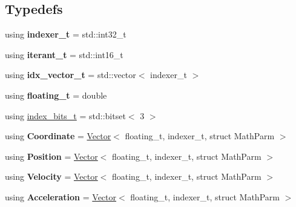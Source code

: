 \subsection*{Typedefs}
\begin{DoxyCompactItemize}
\item 
\mbox{\label{namespacemgs_a373b455db997509a22f67a5df3a194c4}} 
using {\bfseries indexer\+\_\+t} = std\+::int32\+\_\+t
\item 
\mbox{\label{namespacemgs_a0810746635a2da1b13b45c8528762689}} 
using {\bfseries iterant\+\_\+t} = std\+::int16\+\_\+t
\item 
\mbox{\label{namespacemgs_a4db3f28b798eb720761deca45dc72b4c}} 
using {\bfseries idx\+\_\+vector\+\_\+t} = std\+::vector$<$ indexer\+\_\+t $>$
\item 
\mbox{\label{namespacemgs_a8ccddf46143f7d086313e2130efd2b5a}} 
using {\bfseries floating\+\_\+t} = double
\item 
using \hyperlink{namespacemgs_a40c361242ea98fb1ff1241d06f7d5568}{index\+\_\+bits\+\_\+t} = std\+::bitset$<$ 3 $>$
\item 
\mbox{\label{namespacemgs_ad5e2a5cbd5a244b6cb7cc35c6b344cf6}} 
using {\bfseries Coordinate} = \hyperlink{structmgs_1_1Vector}{Vector}$<$ floating\+\_\+t, indexer\+\_\+t, struct Math\+Parm $>$
\item 
\mbox{\label{namespacemgs_ae28c60c3df5c7b1df9107701d7f11bf2}} 
using {\bfseries Position} = \hyperlink{structmgs_1_1Vector}{Vector}$<$ floating\+\_\+t, indexer\+\_\+t, struct Math\+Parm $>$
\item 
\mbox{\label{namespacemgs_ab312d7023c77c0ae9d2310c9f9a1f85f}} 
using {\bfseries Velocity} = \hyperlink{structmgs_1_1Vector}{Vector}$<$ floating\+\_\+t, indexer\+\_\+t, struct Math\+Parm $>$
\item 
\mbox{\label{namespacemgs_a55fd90faa062c49fe9d0aebddf67b27c}} 
using {\bfseries Acceleration} = \hyperlink{structmgs_1_1Vector}{Vector}$<$ floating\+\_\+t, indexer\+\_\+t, struct Math\+Parm $>$
\item 
\mbox{\label{namespacemgs_a7124759a4ff90a99ae945ee55c3d48b4}} 

\end{DoxyCompactItemize}
